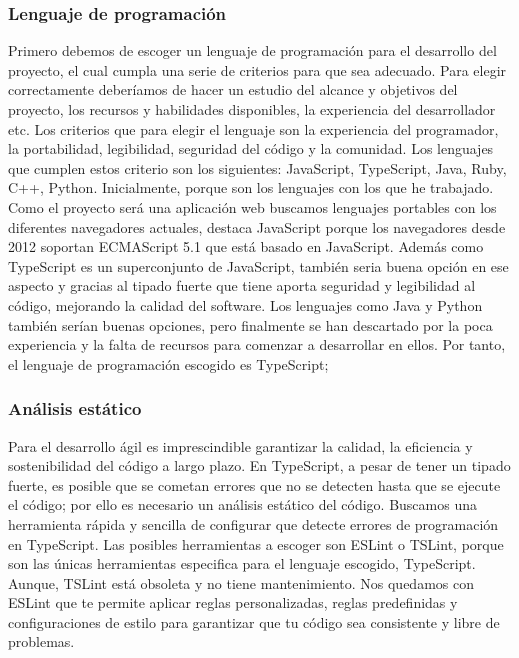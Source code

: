\subsubsection*{Lenguaje de programación}
Primero debemos de escoger un lenguaje de programación para el desarrollo del proyecto, el cual cumpla una serie de criterios para que sea adecuado.
Para elegir correctamente deberíamos de hacer un estudio del alcance y objetivos del proyecto, los recursos y habilidades disponibles, la experiencia del desarrollador etc.
Los criterios que para elegir el lenguaje son la experiencia del programador, la portabilidad, legibilidad, seguridad del código y la comunidad.
Los lenguajes que cumplen estos criterio son los siguientes: JavaScript, TypeScript, Java, Ruby, C++, Python. Inicialmente, porque son los lenguajes con los que he trabajado.
Como el proyecto será una aplicación web buscamos lenguajes portables con los diferentes navegadores actuales, destaca JavaScript porque los navegadores desde 2012 soportan ECMAScript 5.1 que está basado en JavaScript.
Además como TypeScript es un superconjunto de JavaScript, también seria buena opción en ese aspecto y gracias al tipado fuerte que tiene aporta seguridad y legibilidad al código, mejorando la calidad del software.
Los lenguajes como Java y Python también serían buenas opciones, pero finalmente se han descartado por la poca experiencia y la falta de recursos para comenzar a desarrollar en ellos.
Por tanto, el lenguaje de programación escogido es TypeScript;

\subsubsection*{Análisis estático}
Para el desarrollo ágil es imprescindible garantizar la calidad, la eficiencia y sostenibilidad del código a largo plazo.
En TypeScript, a pesar de tener un tipado fuerte, es posible que se cometan errores que no se detecten hasta que se ejecute el código; por ello es necesario un análisis estático del código.
Buscamos una herramienta rápida y sencilla de configurar que detecte errores de programación en TypeScript.
Las posibles herramientas a escoger son ESLint o TSLint, porque son las únicas herramientas especifica para el lenguaje escogido, TypeScript. Aunque, TSLint está obsoleta y no tiene mantenimiento.
Nos quedamos con ESLint que te permite aplicar reglas personalizadas, reglas predefinidas y configuraciones de estilo para garantizar que tu código sea consistente y libre de problemas.

